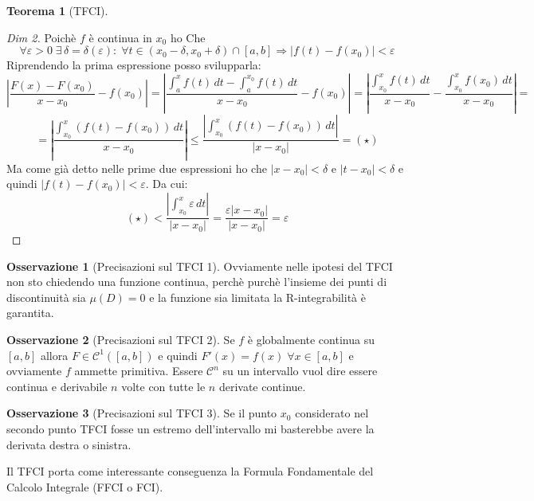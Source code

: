 \documentclass{article}
\theoremstyle{definition}
\newtheorem{theorem}{Teorema}[section]
\theoremstyle{definition}
\theoremstyle{definition}
\theoremstyle{definition}
\newtheorem{remark}{Osservazione}[section]
\theoremstyle{definition}
\theoremstyle{definition}
\begin{document}
\begin{theorem}[TFCI]
\begin{proof}[Dim 2]
        Poichè $f$ è continua in $x_0$ ho Che
        \[
            \forall \varepsilon >0 \; \exists\, \delta=\delta(\varepsilon): \; \forall t\in (x_0-\delta,x_0+\delta) \cap [a,b] \Rightarrow \left|f(t)-f(x_0)\right| < \varepsilon
        \]
        Riprendendo la prima espressione posso svilupparla:
        \[
            \left|\frac{F(x)-F(x_0)}{x-x_0}-f(x_0)\right| = \left|\frac{\int_a^xf(t)\,dt-\int_a^{x_0}f(t)\,dt}{x-x_0}-f(x_0)\right| = \left|\frac{\int_{x_0}^xf(t)\,dt}{x-x_0}-\frac{\int_{x_0}^xf(x_0)\,dt}{x-x_0}\right| = 
        \]
        \[
            =\left|\frac{\int_{x_0}^x(f(t)-f(x_0))\,dt}{x-x_0}\right| \leq \frac{\left|\int_{x_0}^x(f(t)-f(x_0))\,dt\right|}{\left|x-x_0\right|}  = (\star)  
        \]  
        Ma come già detto nelle prime due espressioni ho che $\left|x-x_0\right|<\delta$ e $\left|t-x_0\right|<\delta$ e quindi $\left|f(t)-f(x_0)\right|<\varepsilon$. Da cui:
        \[
            (\star) < \frac{\left|\int_{x_0}^x \varepsilon\,dt\right|}{\left|x-x_0\right|} = \frac{\varepsilon\left|x-x_0\right|}{\left|x-x_0\right|}=\varepsilon    
        \] 
    \end{proof}
\end{theorem}

\begin{remark}[Precisazioni sul TFCI 1]
    Ovviamente nelle ipotesi del TFCI non sto chiedendo una funzione continua, perchè purchè l'insieme dei punti di discontinuità sia $\mu(D)=0$ e la funzione sia limitata la R-integrabilità è garantita.
\end{remark}

\begin{remark}[Precisazioni sul TFCI 2]
    Se $f$ è globalmente continua su $[a,b]$ allora $F\in\mathcal{C}^1([a,b])$ e quindi $F'(x) = f(x) \; \forall x\in[a,b]$ e ovviamente $f$ ammette primitiva. Essere $\mathcal{C}^n$ su un intervallo vuol dire essere continua e derivabile $n$ volte con tutte le $n$ derivate continue.
\end{remark}

\begin{remark}[Precisazioni sul TFCI 3]
    Se il punto $x_0$ considerato nel secondo punto TFCI fosse un estremo dell'intervallo mi basterebbe avere la derivata destra o sinistra.
\end{remark}

Il TFCI porta come interessante conseguenza la Formula Fondamentale del Calcolo Integrale (FFCI o FCI).
\end{document}
